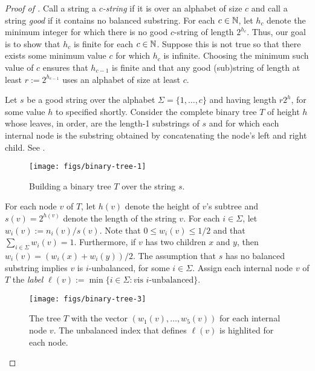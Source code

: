 \documentclass{patmorin}
\begin{document}
\begin{proof}[Proof of ]
  Call a string a \emph{$c$-string} if it is over an alphabet of size $c$
  and call a string \emph{good} if it contains no balanced substring.
  For each $c\in\mathbb{N}$, let $h_c$ denote the minimum integer for which
  there is no good $c$-string of length $2^{h_c}$.  Thus, our goal is
  to show that $h_c$ is finite for each $c\in\mathbb{N}$.
  Suppose this is not true so that there exists some minimum value
  $c$ for which $h_c$ is infinite.  Choosing the minimum such value of 
  $c$ ensures that $h_{c-1}$ is finite and that any good (sub)string of
  length at least $r:=2^{h_{c-1}}$ uses an alphabet of size at least $c$.

  Let $s$ be a good string over the alphabet $\Sigma=\{1,\ldots,c\}$ and having
  length $r2^{h}$, for some value $h$ to specified shortly.   Consider
  the complete binary tree $T$ of height $h$ whose leaves, in order,
  are the length-1 substrings of $s$ and for which each internal node is
  the substring obtained by concatenating the node's left and right child.
  See .

  \begin{figure}
    \begin{center}
       \texttt{[image: figs/binary-tree-1]}
    \end{center}
    \caption{Building a binary tree $T$ over the string $s$.}
  \end{figure}

  For each node $v$ of $T$, let $h(v)$ denote the height of $v$'s subtree
  and $s(v)=2^{h(v)}$ denote the length of the string $v$. For each
  $i\in\Sigma$, let $w_i(v):=n_i(v)/s(v)$.  Note that $0\le w_i(v)\le
  1/2$ and that $\sum_{i\in\Sigma} w_i(v)=1$.  Furthermore, if $v$
  has two children $x$ and $y$, then $w_i(v) = (w_i(x)+w_i(y))/2$.
  The assumption that $s$ has no balanced substring implies $v$ is
  $i$-unbalanced, for some $i\in\Sigma$.  Assign each internal node
  $v$ of $T$ the \emph{label} $\ell(v):=\min\{i\in\Sigma: \mbox{$v$
  is $i$-unbalanced}\}$.

  \begin{figure}
    \begin{center}
       \texttt{[image: figs/binary-tree-3]} 
    \end{center}
    \caption{The tree $T$ with the vector $(w_1(v),\ldots,w_5(v))$ for each
     internal node $v$.  The unbalanced index that defines $\ell(v)$ is highlited for each node.}
  \end{figure}


\end{proof}
\end{document}

